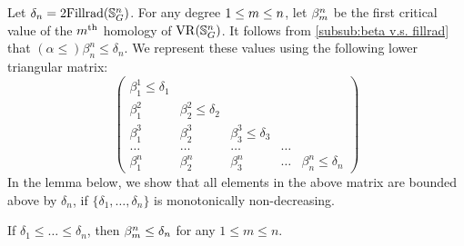 Let $\delta_n=2\mathrm{Fillrad}(\mathbb{S}^n_G)$.
For any degree $1 \leq m \leq n$, let $\beta_{m}^{n}$ be the first critical value of the $m^{\mathrm{th}}$ homology of $\operatorname{VR}(\mathbb{S}^n_G)$.
It follows from \cref{subsub:beta v.s. fillrad} that $(\alpha \leq) \beta_{n}^{n} \leq \delta_n$.
We represent these values using the following lower triangular matrix:
\[
\begin{pmatrix}
	\beta_{1}^{1}\leq \delta_1 & & &&\\
	\beta_1^2 & \beta_{2}^{2} \leq \delta_2 & &&\\
	\beta_1^3 & \beta_{2}^{3} & \beta_{3}^{3} \leq \delta_3 &&\\
	\dots & \dots & \dots & \dots &\\
	\beta_1^n & \beta_2^n & \beta_3^n & \dots & \beta_n^n \leq \delta_n
\end{pmatrix}
\]
In the lemma below, we show that all elements in the above matrix are bounded above by $\delta_n$, if $\{\delta_1, \dots, \delta_n\}$ is monotonically non-decreasing.

\medskip\lemma
If $\delta_1 \leq \dots \leq \delta_n$, then $\beta_{m}^{n} \leq \delta_n$ for any $1 \leq m \leq n$.

